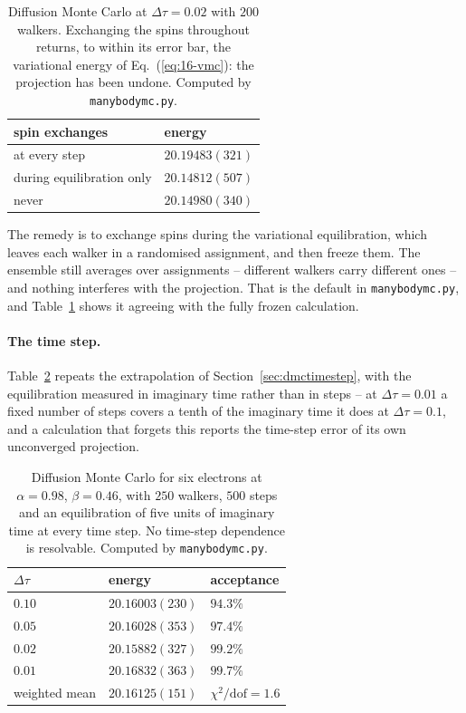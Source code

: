 \begin{table}[h]
\centering
\renewcommand{\arraystretch}{1.2}
\setlength{\tabcolsep}{14pt}
\begin{tabular}{ll}
\toprule
spin exchanges & energy\\
\midrule
at every step & $20.19483(321)$\\
during equilibration only & $20.14812(507)$\\
never & $20.14980(340)$\\
\bottomrule
\end{tabular}
\caption{Diffusion Monte Carlo at $\Delta\tau=0.02$ with $200$ walkers.
Exchanging the spins throughout returns, to within its error bar, the
variational energy of Eq.~(\ref{eq:16-vmc}): the projection has been undone.
Computed by \texttt{manybodymc.py}.}
\label{tab:16-spinmoves}
\end{table}

The remedy is to exchange spins during the variational equilibration, which
leaves each walker in a randomised assignment, and then freeze them.  The
ensemble still averages over assignments -- different walkers carry different
ones -- and nothing interferes with the projection.  That is the default in
\texttt{manybodymc.py}, and Table~\ref{tab:16-spinmoves} shows it agreeing with
the fully frozen calculation.

\paragraph{The time step.}
Table~\ref{tab:16-timestep} repeats the extrapolation of
Section~\ref{sec:dmctimestep}, with the equilibration measured in imaginary
time rather than in steps -- at $\Delta\tau=0.01$ a fixed number of steps
covers a tenth of the imaginary time it does at $\Delta\tau=0.1$, and a
calculation that forgets this reports the time-step error of its own
unconverged projection.

\begin{table}[h]
\centering
\renewcommand{\arraystretch}{1.2}
\setlength{\tabcolsep}{13pt}
\begin{tabular}{lll}
\toprule
$\Delta\tau$ & energy & acceptance\\
\midrule
$0.10$ & $20.16003(230)$ & $94.3\%$\\
$0.05$ & $20.16028(353)$ & $97.4\%$\\
$0.02$ & $20.15882(327)$ & $99.2\%$\\
$0.01$ & $20.16832(363)$ & $99.7\%$\\
\midrule
weighted mean & $20.16125(151)$ & $\chi^2/\mathrm{dof}=1.6$\\
\bottomrule
\end{tabular}
\caption{Diffusion Monte Carlo for six electrons at $\alpha=0.98$,
$\beta=0.46$, with $250$ walkers, $500$ steps and an equilibration of five
units of imaginary time at every time step.  No time-step dependence is
resolvable.  Computed by \texttt{manybodymc.py}.}
\label{tab:16-timestep}
\end{table}

